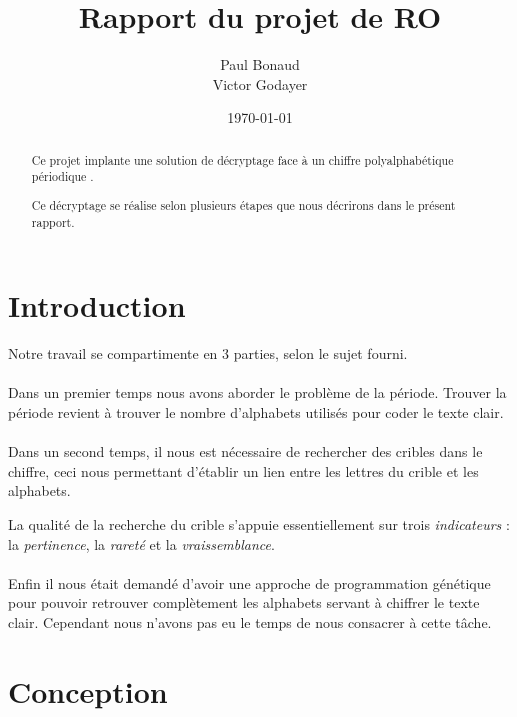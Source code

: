 \documentclass[a4paper, 11pt]{article}
\begin{document}
\title{Rapport du projet de RO}
\author{Paul Bonaud\\
  Victor Godayer}
\date\today

\maketitle

\begin{abstract}
  Ce projet implante une solution de décryptage face à un chiffre
  polyalphabétique périodique .

  Ce décryptage se réalise selon plusieurs étapes que nous décrirons
  dans le présent rapport.
\end{abstract}
\newpage
\tableofcontents
\newpage


\section{Introduction}
Notre travail se compartimente en 3 parties, selon le sujet fourni.

\paragraph{}
Dans un premier temps nous avons aborder le problème de la période.
Trouver la période revient à trouver le nombre d'alphabets utilisés pour
coder le texte clair.

\paragraph{}
Dans un second temps, il nous est nécessaire de rechercher des cribles
dans le chiffre, ceci nous permettant d'établir un lien entre les
lettres du crible et les alphabets.

La qualité de la recherche du crible s'appuie essentiellement sur
trois \textit{indicateurs} : la \textit{pertinence}, la
\textit{rareté} et la \textit{vraissemblance}.

\paragraph{}
Enfin il nous était demandé d'avoir une approche de programmation génétique pour
pouvoir retrouver complètement les alphabets servant à chiffrer le
texte clair. Cependant nous n'avons pas eu le temps de nous consacrer à
cette tâche.


\section{Conception}
\end{document}
